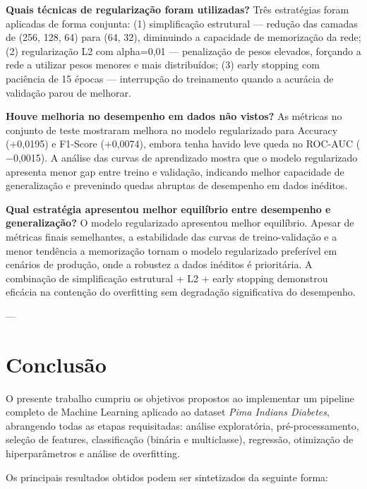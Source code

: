 \documentclass[12pt]{article}
\begin{document}
\textbf{Quais técnicas de regularização foram utilizadas?}
Três estratégias foram aplicadas de forma conjunta: (1) simplificação estrutural --- redução das camadas de (256, 128, 64) para (64, 32), diminuindo a capacidade de memorização da rede; (2) regularização L2 com alpha=0,01 --- penalização de pesos elevados, forçando a rede a utilizar pesos menores e mais distribuídos; (3) early stopping com paciência de 15 épocas --- interrupção do treinamento quando a acurácia de validação parou de melhorar.

\textbf{Houve melhoria no desempenho em dados não vistos?}
As métricas no conjunto de teste mostraram melhora no modelo regularizado para Accuracy (+0,0195) e F1-Score (+0,0074), embora tenha havido leve queda no ROC-AUC ($-$0,0015). A análise das curvas de aprendizado mostra que o modelo regularizado apresenta menor gap entre treino e validação, indicando melhor capacidade de generalização e prevenindo quedas abruptas de desempenho em dados inéditos.

\textbf{Qual estratégia apresentou melhor equilíbrio entre desempenho e generalização?}
O modelo regularizado apresentou melhor equilíbrio. Apesar de métricas finais semelhantes, a estabilidade das curvas de treino-validação e a menor tendência a memorização tornam o modelo regularizado preferível em cenários de produção, onde a robustez a dados inéditos é prioritária. A combinação de simplificação estrutural + L2 + early stopping demonstrou eficácia na contenção do overfitting sem degradação significativa do desempenho.

---

\section{Conclusão}

O presente trabalho cumpriu os objetivos propostos ao implementar um pipeline completo de Machine Learning aplicado ao dataset \textit{Pima Indians Diabetes}, abrangendo todas as etapas requisitadas: análise exploratória, pré-processamento, seleção de features, classificação (binária e multiclasse), regressão, otimização de hiperparâmetros e análise de overfitting.

Os principais resultados obtidos podem ser sintetizados da seguinte forma:
\end{document}

